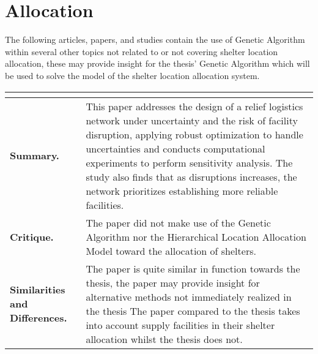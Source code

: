 \section{Allocation}

The following articles, papers, and studies contain the use of Genetic Algorithm within several other topics not related to or not covering shelter location allocation, these may provide insight for the thesis' Genetic Algorithm which will be used to solve the model of the shelter location allocation system.

\begin{longtable}{|L{.2\linewidth}|L{.74\linewidth}|}
	\hline
	\\ \hline
	\textbf{Summary.} & This paper addresses the design of a relief logistics network under uncertainty and the risk of facility disruption, applying robust optimization to handle uncertainties and conducts computational experiments to perform sensitivity analysis. The study also finds that as disruptions increases, the network prioritizes establishing more reliable facilities. \\ \hline
	\textbf{Critique.} & The paper did not make use of the Genetic Algorithm nor the Hierarchical Location Allocation Model toward the allocation of shelters. \\ \hline
	\textbf{Similarities and Differences.} & The paper is quite similar in function towards the thesis, the paper may provide insight for alternative methods not immediately realized in the thesis	The paper compared to the thesis takes into account supply facilities in their shelter allocation whilst the thesis does not.\\ \hline
\end{longtable}

